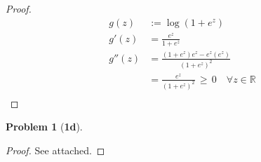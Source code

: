 \documentclass[10pt]{article}
\theoremstyle{plain}
\theoremstyle{definition}
\newtheorem*{prob*}{Problem}
\providecommand{\R}{\mathbb{R}}%
\numberwithin{equation}{section}
\begin{document}
\begin{proof}
  \[
  \begin{aligned}
    g(z)   &:= \log(1+e^{z}) \\
    g'(z)  &= \frac{e^{z}}{1+e^{z}} \\
    g''(z) &= \frac{ (1+e^{z}) e^{z} - e^{z} (e^{z}) }{(1+e^{z})^2} \\
           &= \frac{ e^{z} }{ (1+e^{z})^2 } \, \geq \, 0
                \quad \forall z \in \R \\
  \end{aligned}
  \]
\end{proof}

\begin{prob*}[\bf{1d}]
\end{prob*}

\begin{proof} See attached.
\end{proof}
\end{document}
